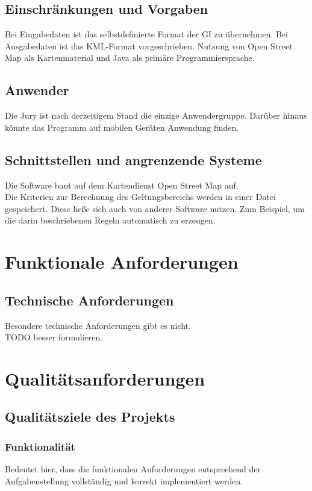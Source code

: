 \subsection{Einschränkungen und Vorgaben}
Bei Eingabedaten ist das selbstdefinierte Format der GI zu übernehmen. Bei Ausgabedaten ist das KML-Format vorgeschrieben. 
Nutzung von Open Street Map als Kartenmaterial und Java als primäre Programmiersprache.
\subsection{Anwender}
Die Jury ist nach derzeitigem Stand die einzige Anwendergruppe. Darüber hinaus könnte das Programm auf mobilen Geräten Anwendung finden.
\subsection{Schnittstellen und angrenzende Systeme}
Die Software baut auf dem Kartendienst Open Street Map auf.\\
Die Kriterien zur Berechnung des Geltungsbereichs werden in einer Datei gespeichert. Diese ließe sich auch von anderer Software nutzen.
Zum Beispiel, um die darin beschriebenen Regeln automatisch zu erzeugen.
\section{Funktionale Anforderungen}
\subsection{Technische Anforderungen}
Besondere technische Anforderungen gibt es nicht.\\
TODO besser formulieren.
\section{Qualitätsanforderungen}
\subsection{Qualitätsziele des Projekts}
\subsubsection{Funktionalität}
Bedeutet hier, dass die funktionalen Anforderungen entsprechend der Aufgabenstellung vollständig und korrekt implementiert werden.

